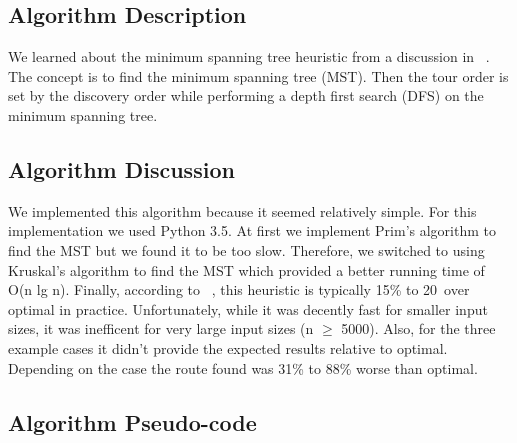 \documentclass[../report/main.tex]{subfiles}
\begin{document}
\subsection*{Algorithm Description}

We learned about the minimum spanning tree heuristic from a discussion in ~\cite{skiena/2008}.  The concept is to find the minimum spanning tree (MST).  Then the tour order is set by the discovery order while performing a depth first search (DFS) on the minimum spanning tree.

\subsection*{Algorithm Discussion}

We implemented this algorithm because it seemed relatively simple.  For this implementation we used Python 3.5.  At first we implement Prim's algorithm to find the MST but we found it to be too slow.  Therefore, we switched to using Kruskal's algorithm to find the MST which provided a better running time of O(n lg n).  Finally, according to ~\cite{skiena/2008}, this heuristic is typically 15\% to 20\ over optimal in practice.  Unfortunately, while it was decently fast for smaller input sizes, it was inefficent for very large input sizes (n $\geq$ 5000).  Also, for the three example cases it didn't provide the expected results relative to optimal.  Depending on the case the route found was 31\% to 88\% worse than optimal. 

\subsection*{Algorithm Pseudo-code}
\end{document}
